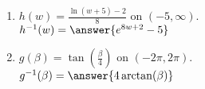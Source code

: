 \documentclass{ximera}
\begin{document}
\begin{exercise}
\begin{exercise}
\begin{enumerate}
\item $h(w) = \frac{\ln(w+5) - 2}{8}$ on $(-5,\infty)$. \\
$h^{-1}(w) = \answer{e^{8w+2}-5}$

\item $g(\beta)= \tan\left(\frac{\beta}{4}\right)$ on $(-2\pi,2\pi)$.\\
$g^{-1}(\beta) = \answer{4\arctan(\beta)}$

\end{enumerate}
\end{exercise}



\end{exercise}
\end{document}
